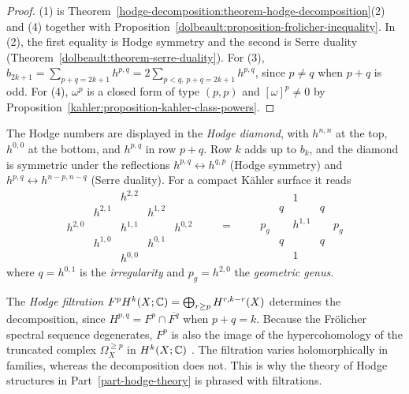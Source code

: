 \begin{proof}
(1) is Theorem~\ref{hodge-decomposition:theorem-hodge-decomposition}(2) and (4) together with
Proposition~\ref{dolbeault:proposition-frolicher-inequality}. In (2), the first equality is Hodge symmetry and the second is Serre duality
(Theorem~\ref{dolbeault:theorem-serre-duality}). For (3), $b_{2k+1} = \sum_{p+q=2k+1}h^{p,q} = 2\sum_{p<q,\ p+q=2k+1}h^{p,q}$, since
$p \neq q$ when $p + q$ is odd. For (4), $\omega^p$ is a closed form of type $(p,p)$ and $[\omega]^p \neq 0$ by
Proposition~\ref{kahler:proposition-kahler-class-powers}.
\end{proof}

\begin{remark}\label{hodge-decomposition:remark-hodge-diamond}
The Hodge numbers are displayed in the \emph{Hodge diamond}, with $h^{n,n}$ at the top, $h^{0,0}$ at the bottom, and $h^{p,q}$ in row
$p + q$. Row $k$ adds up to $b_k$, and the diamond is symmetric under the reflections $h^{p,q} \leftrightarrow h^{q,p}$ (Hodge symmetry) and
$h^{p,q} \leftrightarrow h^{n-p,n-q}$ (Serre duality). For a compact K\"ahler surface it reads
\[
\begin{array}{ccccc}
 & & h^{2,2} & & \\
 & h^{2,1} & & h^{1,2} & \\
h^{2,0} & & h^{1,1} & & h^{0,2} \\
 & h^{1,0} & & h^{0,1} & \\
 & & h^{0,0} & &
\end{array}
\qquad = \qquad
\begin{array}{ccccc}
 & & 1 & & \\
 & q & & q & \\
p_g & & h^{1,1} & & p_g \\
 & q & & q & \\
 & & 1 & &
\end{array}
\]
where $q = h^{0,1}$ is the \emph{irregularity} and $p_g = h^{2,0}$ the \emph{geometric genus}.
\end{remark}

\begin{remark}\label{hodge-decomposition:remark-hodge-filtration}
The \emph{Hodge filtration} $F^pH^k(X; \mathbb{C}) = \bigoplus_{r \geq p}H^{r,k-r}(X)$ determines the decomposition, since
$H^{p,q} = F^p \cap \overline{F^q}$ when $p + q = k$. Because the Fr\"olicher spectral sequence degenerates, $F^p$ is also the image of the
hypercohomology of the truncated complex $\Omega^{\geq p}_X$ in $H^k(X; \mathbb{C})$ \cite[Chapter 8]{voisin-hodge-1}. The filtration varies
holomorphically in families, whereas the decomposition does not. This is why the theory of Hodge structures in
Part~\ref{part-hodge-theory} is phrased with filtrations.
\end{remark}


